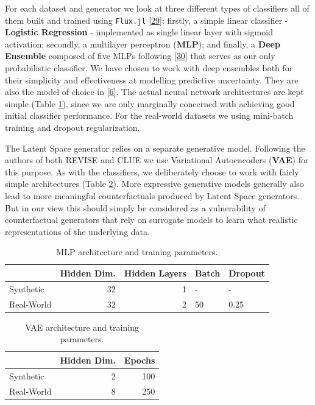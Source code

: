 \documentclass[conference,final,]{IEEEtran}
\theoremstyle{definition}
\theoremstyle{definition}
\theoremstyle{definition}
\theoremstyle{definition}
\theoremstyle{remark}
\begin{document}
For each dataset and generator we look at three different types of classifiers all of them built and trained using \texttt{Flux.jl} \protect\hyperlink{ref-innes2018fashionable}{{[}29{]}}: firstly, a simple linear classifier - \textbf{Logistic Regression} - implemented as single linear layer with sigmoid activation; secondly, a multilayer perceptron (\textbf{MLP}); and finally, a \textbf{Deep Ensemble} composed of five MLPs following \protect\hyperlink{ref-lakshminarayanan2016simple}{{[}30{]}} that serves as our only probabilistic classifier. We have chosen to work with deep ensembles both for their simplicity and effectiveness at modelling predictive uncertainty. They are also the model of choice in \protect\hyperlink{ref-schut2021generating}{{[}6{]}}. The actual neural network architectures are kept simple (Table \ref{tab:mlp}), since we are only marginally concerned with achieving good initial classifier performance. For the real-world datasets we using mini-batch training and dropout regularization.

The Latent Space generator relies on a separate generative model. Following the authors of both REVISE and CLUE we use Variational Autoencoders (\textbf{VAE}) for this purpose. As with the classifiers, we deliberately choose to work with fairly simple architectures (Table \ref{tab:vae}). More expressive generative models generally also lead to more meaningful counterfactuals produced by Latent Space generators. But in our view this should simply be considered as a vulnerability of counterfactual generators that rely on surrogate models to learn what realistic representations of the underlying data.

\begin{table}

\caption{\label{tab:mlp}MLP architecture and training parameters.}
\centering
\begin{tabular}[t]{lrrll}
\toprule
  & Hidden Dim. & Hidden Layers & Batch & Dropout\\
\midrule
Synthetic & 32 & 1 & - & -\\
Real-World & 32 & 2 & 50 & 0.25\\
\bottomrule
\end{tabular}
\end{table}

\begin{table}

\caption{\label{tab:vae}VAE architecture and training parameters.}
\centering
\begin{tabular}[t]{lrr}
\toprule
  & Hidden Dim. & Epochs\\
\midrule
Synthetic & 2 & 100\\
Real-World & 8 & 250\\
\bottomrule
\end{tabular}
\end{table}
\end{document}
